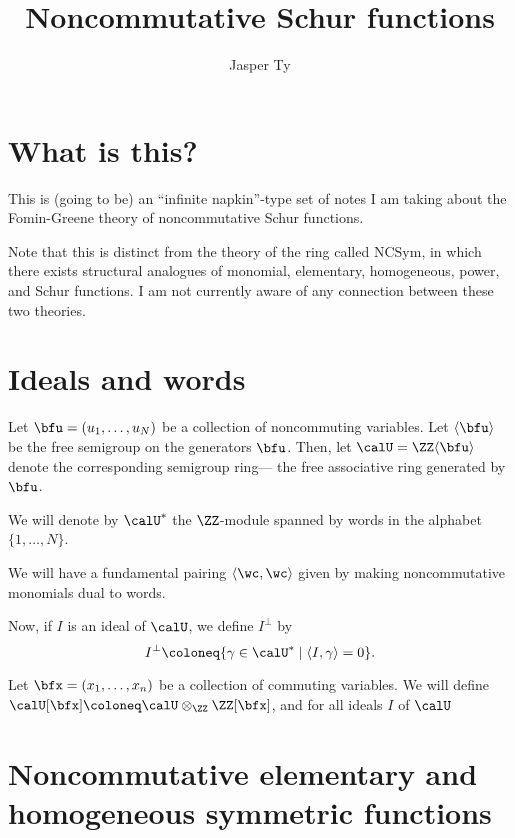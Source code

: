 \documentclass{article}
\title{Noncommutative Schur functions}
\author{Jasper Ty}
\date{}
\newcommand{\ip}[1]{
    \left\langle
        {#1}
    \right\rangle
}
\begin{document}
\maketitle

\section*{What is this?}

This is (going to be) an ``infinite napkin''-type set of notes I am taking about the Fomin-Greene theory of noncommutative Schur functions.

Note that this is distinct from the theory of the ring called $\mathrm{NCSym}$, in which there exists structural analogues of monomial, elementary, homogeneous, power, and Schur functions.
I am not currently aware of any connection between these two theories.

\tableofcontents

\newpage

\section{Ideals and words}

Let $\bfu = (u_1,\ldots,u_N)$ be a collection of noncommuting variables.
Let $\langle \bfu \rangle$ be the free semigroup on the generators $\bfu$.
Then, let $\calU = \ZZ\langle\bfu\rangle$ denote the corresponding semigroup ring--- the free associative ring generated by $\bfu$.

We will denote by $\calU^\ast$ the $\ZZ$-module spanned by words in the alphabet $\{1,\ldots,N\}$.

We will have a fundamental pairing $\ip{\wc,\wc}$ given by making noncommutative monomials dual to words.

Now, if $I$ is an ideal of $\calU$, we define $I^\perp$ by
\[
    I^\perp
    \coloneq
    \{
        \gamma \in \calU^\ast
        \mid
        \ip{I, \gamma} = 0
    \}.
\]

Let $\bfx = (x_1,\ldots,x_n)$ be a collection of commuting variables.
We will define $\calU[\bfx] \coloneq \calU \otimes_{\ZZ} \ZZ[\bfx]$, and for all ideals $I$ of $\calU$

\section{
    Noncommutative elementary and homogeneous symmetric functions
}
\end{document}
